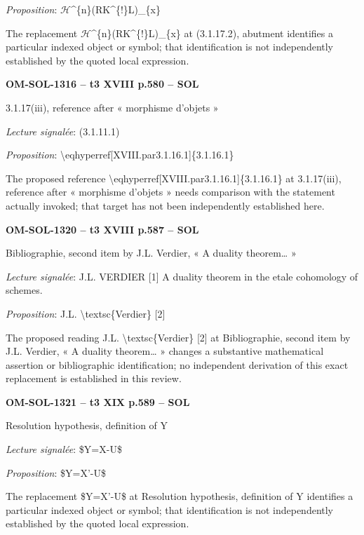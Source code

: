 \emph{Proposition}: \ensuremath{\mathcal{H}}\textasciicircum{}\{n\}(RK\textasciicircum{}\{!\}L)\_\{x\}\par
The replacement \ensuremath{\mathcal{H}}\textasciicircum{}\{n\}(RK\textasciicircum{}\{!\}L)\_\{x\} at (3.1.17.2), abutment identifies a particular indexed object or symbol; that identification is not independently established by the quoted local expression.\par
\par\noindent\textbf{OM-SOL-1316 -- t3 XVIII p.580 -- SOL}\par
3.1.17(iii), reference after « morphisme d'objets »\par
\emph{Lecture signalée}: (3.1.11.1)\par
\emph{Proposition}: \textbackslash{}eqhyperref[XVIII.par3.1.16.1]\{3.1.16.1\}\par
The proposed reference \textbackslash{}eqhyperref[XVIII.par3.1.16.1]\{3.1.16.1\} at 3.1.17(iii), reference after « morphisme d'objets » needs comparison with the statement actually invoked; that target has not been independently established here.\par
\par\noindent\textbf{OM-SOL-1320 -- t3 XVIII p.587 -- SOL}\par
Bibliographie, second item by J.L. Verdier, « A duality theorem… »\par
\emph{Lecture signalée}: J.L. VERDIER [1] A duality theorem in the etale cohomology of schemes.\par
\emph{Proposition}: J.L. \textbackslash{}textsc\{Verdier\} [2]\par
The proposed reading J.L. \textbackslash{}textsc\{Verdier\} [2] at Bibliographie, second item by J.L. Verdier, « A duality theorem… » changes a substantive mathematical assertion or bibliographic identification; no independent derivation of this exact replacement is established in this review.\par
\par\noindent\textbf{OM-SOL-1321 -- t3 XIX p.589 -- SOL}\par
Resolution hypothesis, definition of Y\par
\emph{Lecture signalée}: \$Y=\allowbreak X-U\$\par
\emph{Proposition}: \$Y=\allowbreak X'-U\$\par
The replacement \$Y=\allowbreak X'-U\$ at Resolution hypothesis, definition of Y identifies a particular indexed object or symbol; that identification is not independently established by the quoted local expression.\par

